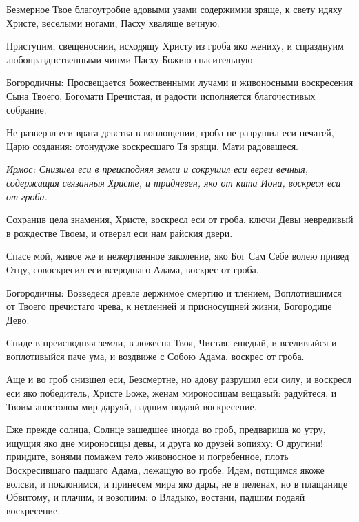 Безмерное Твое благоутробие адовыми узами содержимии зряще, к свету идяху Христе, веселыми ногами, Пасху хваляще вечную. 



Приступим, свещеноснии, исходящу Христу из гроба яко жениху, и спразднуим любопразднственными чинми Пасху Божию спасительную. \itshape 

Богородичны\normalfont{}: Просвещается божественными лучами и живоносными воскресения Сына Твоего, Богомати Пречистая, и радости исполняется благочестивых собрание. 



Не разверзл еси врата девства в воплощении, гроба не разрушил еси печатей, Царю создания: отонудуже воскресшаго Тя зрящи, Мати радовашеся. 


\itshape Ирмос\normalfont{}: Снизшел еси в преисподняя земли и сокрушил еси вереи вечныя, содержащия связанныя Христе, и тридневен, яко от кита Иона, воскресл еси от гроба. 



Сохранив цела знамения, Христе, воскресл еси от гроба, ключи Девы невредивый в рождестве Твоем, и отверзл еси нам райския двери. 



Спасе мой, живое же и нежертвенное заколение, яко Бог Сам Себе волею привед Отцу, совоскресил еси всероднаго Адама, воскрес от гроба. \itshape 

Богородичны\normalfont{}: Возведеся древле держимое смертию и тлением, Воплотившимся от Твоего пречистаго чрева, к нетленней и присносущней жизни, Богородице Дево. 



Сниде в преисподняя земли, в ложесна Твоя, Чистая, cшедый, и вселивыйся и воплотивыйся паче ума, и воздвиже с Собою Адама, воскрес от гроба. 


Аще и во гроб снизшел еси, Безсмертне, но адову разрушил еси силу, и воскресл еси яко победитель, Христе Боже, женам мироносицам вещавый: радуйтеся, и Твоим апостолом мир даруяй, падшим подаяй воскресение. 


Еже прежде солнца, Солнце зашедшее иногда во гроб, предвариша ко утру, ищущия яко дне мироносицы девы, и друга ко друзей вопияху: О другини! приидите, вонями помажем тело живоносное и погребенное, плоть Воскресившаго падшаго Адама, лежащую во гробе. Идем, потщимся якоже волсви, и поклонимся, и принесем мира яко дары, не в пеленах, но в плащанице Обвитому, и плачим, и возопиим: о Владыко, востани, падшим подаяй воскресение. 



